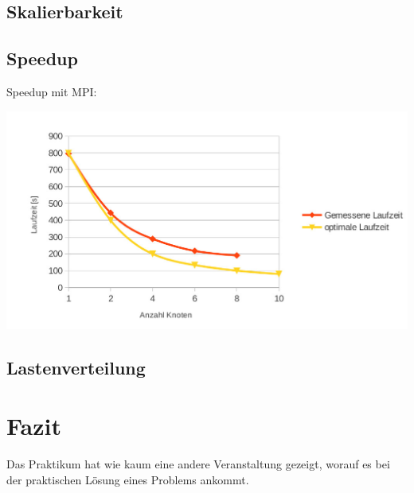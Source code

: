 \documentclass[
	12pt,
	a4paper,
	BCOR10mm,
	DIV14,
	listof=totoc,
	bibliography=totoc,
	headsepline
]{scrreprt}
\begin{document}
\section{Skalierbarkeit}

\section{Speedup}

Speedup mit MPI: 

\includegraphics[scale=0.44]{speedup}

\section{Lastenverteilung}


\chapter{Fazit}
\label{Fazit}


Das Praktikum hat wie kaum eine andere Veranstaltung gezeigt, worauf es bei der praktischen Lösung eines Problems ankommt.
\end{document}
